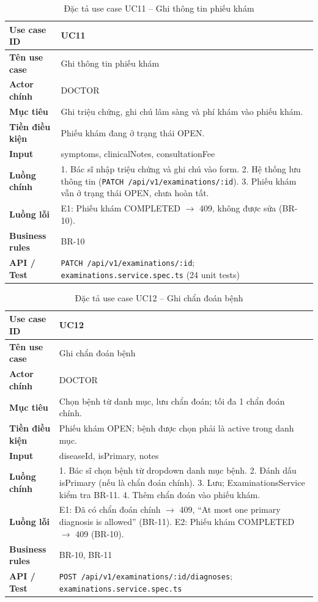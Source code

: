 \begin{table}[H]
\centering
\caption{Đặc tả use case UC11 -- Ghi thông tin phiếu khám}
\label{tab:uc11}
\begin{tabularx}{\textwidth}{|p{3.6cm}|X|}
\hline
\textbf{Use case ID} & UC11 \\
\hline
\textbf{Tên use case} & Ghi thông tin phiếu khám \\
\hline
\textbf{Actor chính} & DOCTOR \\
\hline
\textbf{Mục tiêu} & Ghi triệu chứng, ghi chú lâm sàng và phí khám vào phiếu khám. \\
\hline
\textbf{Tiền điều kiện} & Phiếu khám đang ở trạng thái OPEN. \\
\hline
\textbf{Input} & symptoms, clinicalNotes, consultationFee \\
\hline
\textbf{Luồng chính} & 1. Bác sĩ nhập triệu chứng và ghi chú vào form. 2. Hệ thống lưu thông tin (\texttt{PATCH /api/v1/examinations/:id}). 3. Phiếu khám vẫn ở trạng thái OPEN, chưa hoàn tất. \\
\hline
\textbf{Luồng lỗi} & E1: Phiếu khám COMPLETED $\rightarrow$ 409, không được sửa (BR-10). \\
\hline
\textbf{Business rules} & BR-10 \\
\hline
\textbf{API / Test} & \texttt{PATCH /api/v1/examinations/:id}; \texttt{examinations.service.spec.ts} (24 unit tests) \\
\hline
\end{tabularx}
\end{table}

\begin{table}[H]
\centering
\caption{Đặc tả use case UC12 -- Ghi chẩn đoán bệnh}
\label{tab:uc12}
\begin{tabularx}{\textwidth}{|p{3.6cm}|X|}
\hline
\textbf{Use case ID} & UC12 \\
\hline
\textbf{Tên use case} & Ghi chẩn đoán bệnh \\
\hline
\textbf{Actor chính} & DOCTOR \\
\hline
\textbf{Mục tiêu} & Chọn bệnh từ danh mục, lưu chẩn đoán; tối đa 1 chẩn đoán chính. \\
\hline
\textbf{Tiền điều kiện} & Phiếu khám OPEN; bệnh được chọn phải là active trong danh mục. \\
\hline
\textbf{Input} & diseaseId, isPrimary, notes \\
\hline
\textbf{Luồng chính} & 1. Bác sĩ chọn bệnh từ dropdown danh mục bệnh. 2. Đánh dấu isPrimary (nếu là chẩn đoán chính). 3. Lưu; ExaminationsService kiểm tra BR-11. 4. Thêm chẩn đoán vào phiếu khám. \\
\hline
\textbf{Luồng lỗi} & E1: Đã có chẩn đoán chính $\rightarrow$ 409, ``At most one primary diagnosis is allowed'' (BR-11). E2: Phiếu khám COMPLETED $\rightarrow$ 409 (BR-10). \\
\hline
\textbf{Business rules} & BR-10, BR-11 \\
\hline
\textbf{API / Test} & \texttt{POST /api/v1/examinations/:id/diagnoses}; \texttt{examinations.service.spec.ts} \\
\hline
\end{tabularx}
\end{table}

